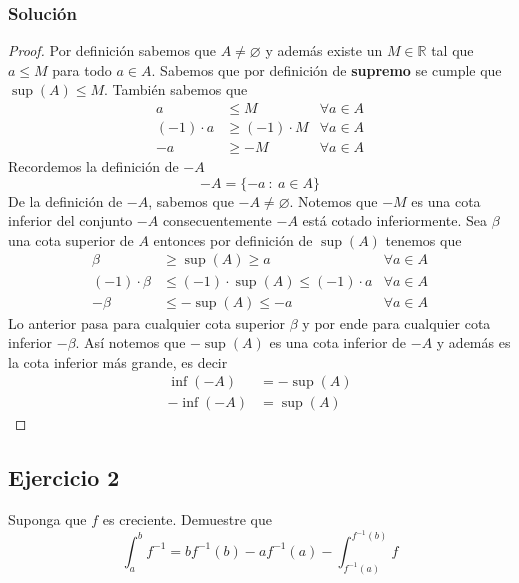 \documentclass[a4paper]{article}
\begin{document}
\subsubsection*{Solución}
\begin{proof}
    Por definición sabemos que \(A \neq \varnothing\) y además existe un \(M \in \mathbb{R}\)
    tal que \(a \leq M\) para todo \(a \in A\). Sabemos que por definición de \textbf{supremo}
    se cumple que \(\sup{\left(A\right)} \leq M\). 
    También sabemos que
    \begin{align*}
        a &\leq M &\forall a \in A \\
        (-1) \cdot a &\geq (-1) \cdot M &\forall a \in A \\
        -a &\geq -M &\forall a \in A
    \end{align*}
    Recordemos la definición de \(-A\)
    \[
        -A = \{-a \ : \ a \in A\}
    \]
    De la definición de \(-A\), sabemos que \(-A \neq \varnothing\).
    Notemos que \(-M\) es una cota inferior del conjunto \(-A\)
    consecuentemente \(-A\) está cotado inferiormente. Sea \(\beta\) una cota 
    superior de \(A\) entonces por definición de \(\sup{\left(A\right)}\) tenemos que
    \begin{align*}
        \beta &\geq \sup{\left(A\right)} \geq a & \forall a \in A \\
        (-1) \cdot \beta &\leq (-1) \cdot \sup{\left(A\right)} \leq (-1) \cdot a & \forall a \in A \\
        -\beta &\leq -\sup{\left(A\right)} \leq -a & \forall a \in A
    \end{align*}
    Lo anterior pasa para cualquier cota superior \(\beta\) y por ende para cualquier cota inferior \(-\beta\).
    \newline
    Así notemos que \(-\sup{\left(A\right)}\) es una cota inferior de \(-A\) y además es la cota inferior 
    más grande, es decir
    \begin{align*}
        \inf{\left(-A\right)} &= -\sup{\left(A\right)} \\
        -\inf{\left(-A\right)} &= \sup{\left(A\right)}
    \end{align*}
\end{proof}
\subsection{Ejercicio 2}
Suponga que \(f\) es creciente. Demuestre que
\[
    \int_{a}^{b} f^{-1} = bf^{-1}(b) - af^{-1}(a) - \int_{f^{-1}(a)}^{f^{-1}(b)}f
\]
\end{document}
